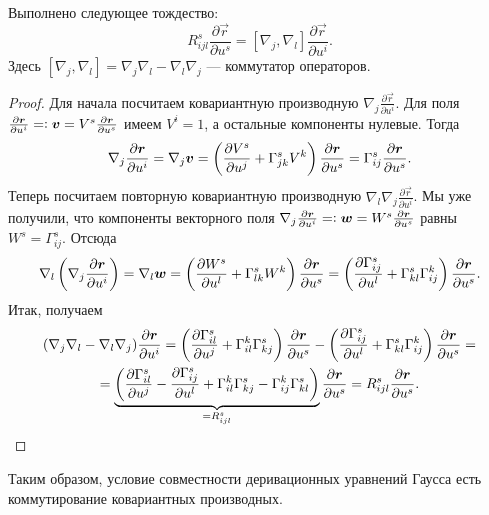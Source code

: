 \begin{lemma} \label{lemma:Rsijl}
	Выполнено следующее тождество:
	\[
		R^s_{ijl}\frac{\partial\vec{r}}{\partial u^s} = [\nabla_j, \nabla_l]\frac{\partial\vec{r}}{\partial u^i}.
	\]
	Здесь $[\nabla_j, \nabla_l] = \nabla_j\nabla_l - \nabla_l\nabla_j$ --- коммутатор операторов.
\end{lemma}

\begin{proof}
	Для начала посчитаем ковариантную производную $\nabla_j\frac{\partial\vec{r}}{\partial u^i}$. Для поля $\frac{\partial\vec{r}}{\partial u^i} = \vcentcolon \vec{v} = V^s\frac{\partial\vec{r}}{\partial u^s}$ имеем $V^i = 1$, а остальные компоненты нулевые. Тогда
	\[
		\nabla_j\frac{\partial \vec{r}}{\partial u^i} = \nabla_j\vec{v} = \br{\frac{\partial V^s}{\partial u^j} + \Gamma_{jk}^sV^k}\frac{\partial\vec{r}}{\partial u^s} = \Gamma_{ij}^s\frac{\partial\vec{r}}{\partial u^s}.
	\]
	Теперь посчитаем повторную ковариантную производную $\nabla_l\nabla_j\frac{\partial\vec{r}}{\partial u^i}$. Мы уже получили, что компоненты векторного поля $\nabla_j\frac{\partial\vec{r}}{\partial u^i} = \vcentcolon \vec{w} = W^s\frac{\partial\vec{r}}{\partial u^s}$ равны $W^s = \Gamma_{ij}^s$. Отсюда
	\[
		\nabla_l\br{\nabla_j\frac{\partial\vec{r}}{\partial u^i}} = \nabla_l\vec{w} = \br{\frac{\partial W^s}{\partial u^l} + \Gamma_{lk}^sW^k}\frac{\partial\vec{r}}{\partial u^s} = \br{\frac{\partial\Gamma_{ij}^s}{\partial u^l} + \Gamma_{kl}^s\Gamma_{ij}^k}\frac{\partial\vec{r}}{\partial u^s}.
	\]
	Итак, получаем
	\begin{multline*}
		(\nabla_j\nabla_l - \nabla_l\nabla_j)\frac{\partial\vec{r}}{\partial u^i} = \br{\frac{\partial\Gamma_{il}^s}{\partial u^j} + \Gamma_{il}^k\Gamma_{kj}^s}\frac{\partial\vec{r}}{\partial u^s} - \br{\frac{\partial\Gamma_{ij}^s}{\partial u^l} + \Gamma_{kl}^s\Gamma_{ij}^k}\frac{\partial\vec{r}}{\partial u^s} =\\ = \underbrace{\br{\frac{\partial\Gamma_{il}^s}{\partial u^j} - \frac{\partial\Gamma_{ij}^s}{\partial u^l} + \Gamma_{il}^k\Gamma_{kj}^s - \Gamma_{ij}^k\Gamma_{kl}^s}}_{= R^s_{ijl}}\frac{\partial\vec{r}}{\partial u^s} = R^s_{ijl}\frac{\partial\vec{r}}{\partial u^s}.
	\end{multline*}
\end{proof}

Таким образом, условие совместности деривационных уравнений Гаусса есть коммутирование ковариантных производных.

